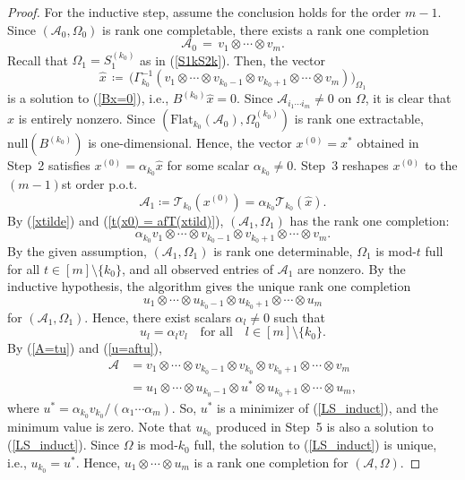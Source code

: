 \documentclass{amsart}
\def\af{\alpha}
\newcommand{\reff}[1]{(\ref{#1})}
\newcommand{\mc}[1]{\mathcal{#1}}
\newcommand{\Flat}{\mbox{Flat}}
\newcommand{\be}{\begin{equation}}
\newcommand{\ee}{\end{equation}}
\theoremstyle{definition}
\numberwithin{equation}{section}
\begin{document}
\begin{proof}
For the inductive step, assume the conclusion holds for the order $m-1$. 
Since $(\mc{A}_0, \Omega_0)$ is rank one completable, there exists a rank one completion  
\be\label{A=tu}
\mc{A}_0 \,=\, v_1 \otimes \cdots \otimes v_m.
\ee
Recall that $\Omega_1 = S_1^{(k_0)}$ as in \reff{S1kS2k}.
Then, the vector
\be\label{xtilde}
\hat{x} \,\coloneqq\, \big( \Gamma_{k_0}^{-1}( v_1 \otimes \cdots \otimes v_{k_0-1} \otimes v_{k_0+1} \otimes \cdots \otimes v_m ) \big)_{\Omega_1} 
\ee
is a solution to \reff{Bx=0}, i.e., $B^{(k_0)} \hat{x} = 0$.
Since $\mc{A}_{i_1 \cdots i_m} \ne 0$ on $\Omega$, 
it is clear that $\hat{x}$ is entirely nonzero.
Since $(\Flat_{k_0}(\mc{A}_0),\Omega_0^{(k_0)})$ is rank one extractable, 
$\text{null}(B^{(k_0)})$ is one-dimensional.
Hence, the vector $x^{(0)} = x^*$ obtained in Step~2 satisfies
$x^{(0)} = \af_{k_0} \hat{x}$ for some scalar $\af_{k_0} \ne 0$.
Step~3 reshapes $x^{(0)}$ to the $(m-1)$st order p.o.t.
\be\label{t(x0) = afT(xtild)}
\mc{A}_1 \coloneqq \mc{T}_{k_0}(x^{(0)}) 
= \af_{k_0} \mc{T}_{k_0}(\hat{x}).
\ee
By \reff{xtilde} and \reff{t(x0) = afT(xtild)}, $(\mc{A}_1, \Omega_1)$ has the rank one completion:
\[
\af_{k_0} v_1 \otimes \cdots \otimes v_{k_0-1} \otimes v_{k_0+1} \otimes \cdots \otimes v_m.
\]
By the given assumption, $(\mc{A}_1, \Omega_1)$ is rank one determinable,
$\Omega_1$ is mod-$t$ full for all $t \in [m] \setminus \{k_0\}$,
and all observed entries of $\mc{A}_1$ are nonzero.
By the inductive hypothesis, the algorithm gives the unique rank one completion
\[
u_1 \otimes \cdots \otimes u_{k_0-1} \otimes u_{k_0+1} \otimes \cdots \otimes u_m
\]
for $(\mc{A}_1, \Omega_1)$.
Hence, there exist scalars $\af_l \ne 0$ such that
\be\label{u=aftu}
u_l = \af_l v_l \quad \text{for all} \quad l \in [m] \setminus \{k_0\}. 
\ee
By \reff{A=tu} and \reff{u=aftu},
\begin{align*}
\mc{A} 
&= v_1 \otimes \cdots \otimes v_{k_0-1} \otimes v_{k_0} \otimes v_{k_0+1} \otimes \cdots \otimes v_m \\
&= u_1 \otimes \cdots \otimes u_{k_0-1} \otimes u^* \otimes u_{k_0+1} \otimes \cdots \otimes u_m,
\end{align*}
where
$
u^* = \af_{k_0} v_{k_0} / (\af_1 \cdots \af_m).
$
So, $u^*$ is a minimizer of \reff{LS_induct}, and the minimum value is zero.
Note that $u_{k_0}$ produced in Step~5 is also a solution to \reff{LS_induct}.
Since $\Omega$ is mod-$k_0$ full, 
the solution to \reff{LS_induct} is unique, i.e., $u_{k_0} = u^*$.
Hence, $u_1 \otimes \cdots \otimes u_m$ is a rank one completion for $(\mc{A}, \Omega)$.
\end{proof}
\end{document}
